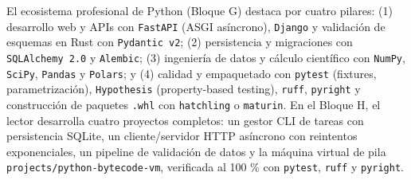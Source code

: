 \documentclass{book}
\begin{document}
El ecosistema profesional de Python (Bloque G) destaca por cuatro pilares: (1) desarrollo web y APIs con \texttt{FastAPI} (ASGI asíncrono), \texttt{Django} y validación de esquemas en Rust con \texttt{Pydantic v2}; (2) persistencia y migraciones con \texttt{SQLAlchemy 2.0} y \texttt{Alembic}; (3) ingeniería de datos y cálculo científico con \texttt{NumPy}, \texttt{SciPy}, \texttt{Pandas} y \texttt{Polars}; y (4) calidad y empaquetado con \texttt{pytest} (fixtures, parametrización), \texttt{Hypothesis} (property-based testing), \texttt{ruff}, \texttt{pyright} y construcción de paquetes \texttt{.whl} con \texttt{hatchling} o \texttt{maturin}. En el Bloque H, el lector desarrolla cuatro proyectos completos: un gestor CLI de tareas con persistencia SQLite, un cliente/servidor HTTP asíncrono con reintentos exponenciales, un pipeline de validación de datos y la máquina virtual de pila \texttt{projects/python-bytecode-vm}, verificada al 100 \% con \texttt{pytest}, \texttt{ruff} y \texttt{pyright}.
\end{document}
